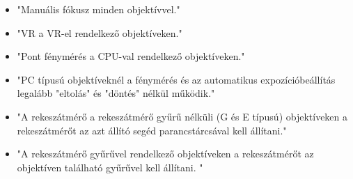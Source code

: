 \begin{itemize}
    \item "Manuális fókusz minden objektívvel."\cite{Nikon_D6_referencia_használati_utasítás}
    \item "VR a VR-el rendelkező objektíveken."\cite{Nikon_D6_referencia_használati_utasítás}
    \item "Pont fénymérés a CPU-val rendelkező objektíveken."\cite{Nikon_D6_referencia_használati_utasítás}
    \item "PC típusú objektíveknél a fénymérés és az automatikus expozícióbeállítás legalább "eltolás" és "döntés" nélkül működik."\cite{Nikon_D6_referencia_használati_utasítás}
    \item "A rekeszátmérő a rekeszátmérő gyűrű nélküli (G és E típusú) objektíveken a rekeszátmérőt az azt állító segéd parancstárcsával kell állítani."\cite{Nikon_D6_referencia_használati_utasítás}
    \item "A rekeszátmérő gyűrűvel rendelkező objektíveken a rekeszátmérőt az objektíven található gyűrűvel kell állítani. "\cite{Nikon_D6_referencia_használati_utasítás}
    
\end{itemize}

\clearpage

